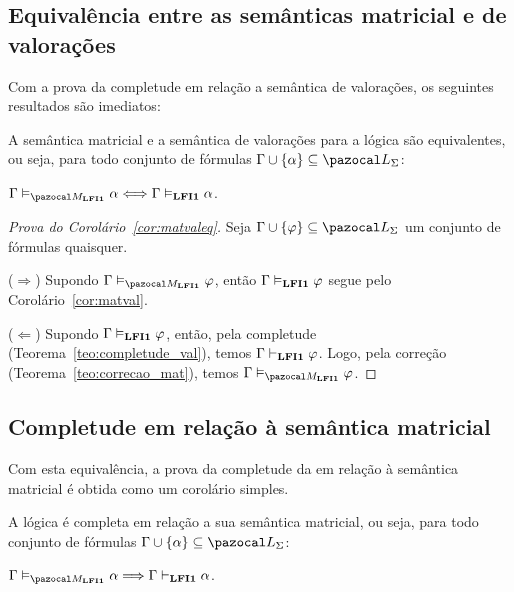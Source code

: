         \subsection{Equivalência entre as semânticas matricial e de valorações}\label{sec:equiv}
        Com a prova da completude em relação a semântica de valorações, os seguintes resultados são imediatos:

        \begin{corolario}\label{cor:matvaleq}
            A semântica matricial e a semântica de valorações para a lógica {\normalfont\lfium{}} são equivalentes, ou seja, para todo conjunto de fórmulas $\Gamma \cup \{\alpha\} \subseteq \ling{}$:

            \centering
            {\normalfont{} $\Gamma \conmat \alpha \Longleftrightarrow \Gamma \conval \alpha$.}

        \end{corolario}

        \begin{proof}[Prova do Corolário~\ref{cor:matvaleq}]
            Seja $\Gamma \cup \{\phi\} \subseteq \ling{}$ um conjunto de fórmulas quaisquer.

            \noindent ($\Longrightarrow$) Supondo $\Gamma \conmat \phi$, então $\Gamma \vDash_{{\normalfont\textbf{LFI1}}{}} \varphi$ segue pelo Corolário~\ref{cor:matval}.

            \noindent ($\Longleftarrow$) Supondo $\Gamma \vDash_{{\normalfont\textbf{LFI1}}{}} \varphi$, então, pela completude (Teorema~\ref{teo:completude_val}), temos $\Gamma \vdash_{{\normalfont\textbf{LFI1}}{}} \varphi$. Logo, pela correção (Teorema~\ref{teo:correcao_mat}), temos $\Gamma \conmat \phi$. \qedhere

        \end{proof}

        \subsection{Completude em relação à semântica matricial}\label{sec:comp_mat}
        
        Com esta equivalência, a prova da completude da \lfium{} em relação à semântica matricial é obtida como um corolário simples.


        \begin{corolario}\label{teo:completude_mat}
            A lógica {\normalfont\lfium{}} é completa em relação a sua semântica matricial, ou seja, para todo conjunto de fórmulas $\Gamma \cup \{\alpha\} \subseteq \ling{}$:

            \centering
            {\normalfont{} $\Gamma \conmat \alpha \Longrightarrow \Gamma \conhil \alpha$.}

        \end{corolario}

